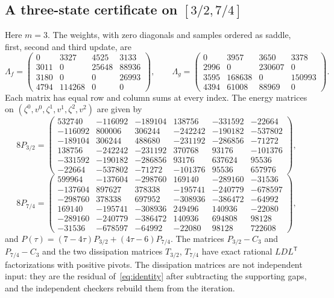 \documentclass[11pt]{article}
\numberwithin{equation}{section}
\theoremstyle{definition}
\theoremstyle{remark}
\begin{document}
\subsection{A three-state certificate on \texorpdfstring{$[3/2,7/4]$}{[3/2, 7/4]}}
Here $m=3$. The weights, with zero diagonals and samples ordered as saddle, first, second and third update, are
\[
\Lambda_f=\begin{pmatrix}
0&3327&4525&3133\\3011&0&25648&88936\\3180&0&0&26993\\4794&114268&0&0
\end{pmatrix},\qquad
\Lambda_g=\begin{pmatrix}
0&3957&3650&3378\\2996&0&230607&0\\3595&168638&0&150993\\4394&61008&88969&0
\end{pmatrix}.
\]
Each matrix has equal row and column sums at every index. The energy matrices on $(\zeta^0,v^0,\zeta^1,v^1,\zeta^2,v^2)$ are given by
{\small
\setlength{\arraycolsep}{3pt}
\[
8P_{3/2}=\begin{pmatrix}
532740&-116092&-189104&138756&-331592&-22664\\
-116092&800006&306244&-242242&-190182&-537802\\
-189104&306244&488680&-231192&-286856&-71272\\
138756&-242242&-231192&370768&93176&-101376\\
-331592&-190182&-286856&93176&637624&95536\\
-22664&-537802&-71272&-101376&95536&657976
\end{pmatrix},
\]
\[
8P_{7/4}=\begin{pmatrix}
599964&-137604&-298760&169140&-289160&-31536\\
-137604&897627&378338&-195741&-240779&-678597\\
-298760&378338&697952&-308936&-386472&-64992\\
169140&-195741&-308936&249496&140936&-22080\\
-289160&-240779&-386472&140936&694808&98128\\
-31536&-678597&-64992&-22080&98128&722608
\end{pmatrix},
\]}
and $P(\tau)=(7-4\tau)P_{3/2}+(4\tau-6)P_{7/4}$. The matrices $P_{3/2}-C_3$ and $P_{7/4}-C_3$ and the two dissipation matrices $T_{3/2}$, $T_{7/4}$ have exact rational $LDL^{\mathsf T}$ factorizations with positive pivots. The dissipation matrices are not independent input: they are the residual of~\eqref{eq:identity} after subtracting the supporting gaps, and the independent checkers rebuild them from the iteration.
\end{document}
